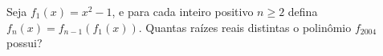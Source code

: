 Seja \(f_1(x)=x^2-1\), e para cada inteiro positivo \(n \geq 2\) defina \(f_n(x) = f_{n-1}(f_1(x))\). Quantas raízes reais distintas o polinômio \(f_{2004}\) possui?
